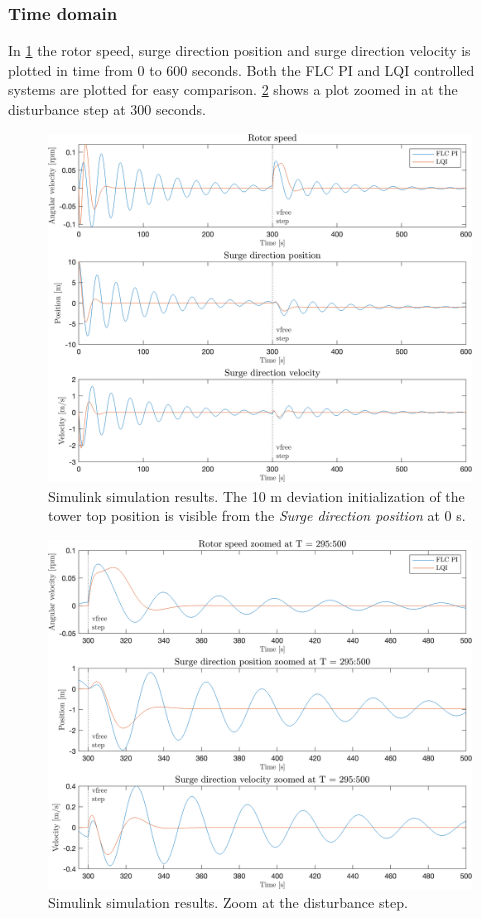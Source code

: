\subsubsection{Time domain}
In \cref{fig:02_W_py_vy_comp} the rotor speed, surge direction position and surge direction velocity is plotted in time from 0 to 600 seconds. Both the FLC PI and LQI controlled systems are plotted for easy comparison. \cref{fig:03_W_py_vy_comp_zoom} shows a plot zoomed in at the disturbance step at 300 seconds.
\begin{figure}[ht]
	\centering
	\includegraphics[width=0.7\linewidth]{Graphics/TestResults/linearModPerf/02_W_py_vy_comp.png}
	\caption{Simulink simulation results. The 10 m deviation initialization of the tower top position is visible from the \textit{Surge direction position} at 0 s.}
	\label{fig:02_W_py_vy_comp}
\end{figure}

\begin{figure}[ht]
	\centering
	\includegraphics[width=0.7\linewidth]{Graphics/TestResults/linearModPerf/03_W_py_vy_comp_zoom.png}
	\caption{Simulink simulation results. Zoom at the disturbance step.}
	\label{fig:03_W_py_vy_comp_zoom}
\end{figure}


